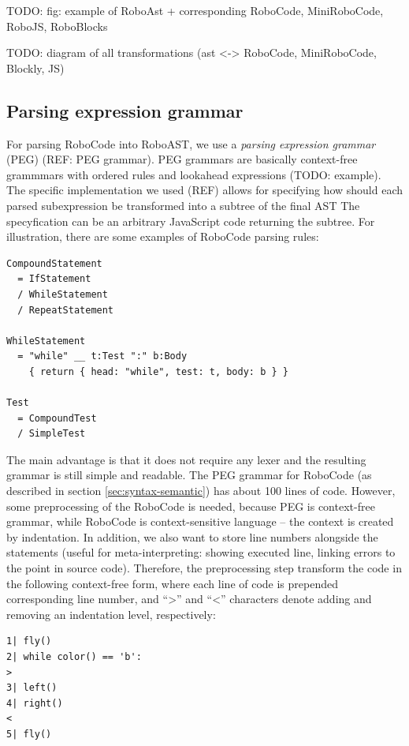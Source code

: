 TODO: fig: example of RoboAst + corresponding RoboCode, MiniRoboCode, RoboJS, RoboBlocks

TODO: diagram of all transformations (ast <-> RoboCode, MiniRoboCode, Blockly, JS)

\subsection{Parsing expression grammar}

For parsing RoboCode into RoboAST, we use a \emph{parsing expression grammar}
(PEG) (REF: PEG grammar).
PEG grammars are basically context-free grammmars with ordered rules
and lookahead expressions (TODO: example).
The specific implementation we used (REF) allows for specifying how should each
parsed subexpression be transformed into a subtree of the final AST
The specyfication can be an arbitrary JavaScript code returning the subtree.
For illustration, there are some examples of RoboCode parsing rules:

\begin{lstlisting}
CompoundStatement
  = IfStatement
  / WhileStatement
  / RepeatStatement

WhileStatement
  = "while" __ t:Test ":" b:Body
    { return { head: "while", test: t, body: b } }

Test
  = CompoundTest
  / SimpleTest
\end{lstlisting}

The main advantage is that it does not require any lexer and the resulting grammar
is still simple and readable.
The PEG grammar for RoboCode (as described in section \ref{sec:syntax-semantic})
has about 100 lines of code.
However, some preprocessing of the RoboCode is needed, because
PEG is context-free grammar,
while RoboCode is context-sensitive language
-- the context is created by indentation.
In addition, we also want to store line numbers alongside the statements
(useful for meta-interpreting:
showing executed line,
linking errors to the point in source code).
Therefore, the preprocessing step transform the code in the following context-free form,
where each line of code is prepended corresponding line number,
and ``>'' and ``<'' characters denote adding and removing an indentation level, respectively:

\begin{lstlisting}
1| fly()
2| while color() == 'b':
>
3| left()
4| right()
<
5| fly()
\end{lstlisting}

